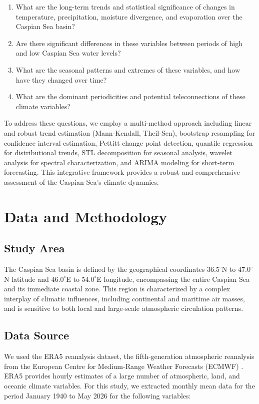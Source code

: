 \documentclass[12pt,a4paper]{article}
\begin{document}
\begin{enumerate}
    \item What are the long-term trends and statistical significance of changes in temperature, precipitation, moisture divergence, and evaporation over the Caspian Sea basin?
    \item Are there significant differences in these variables between periods of high and low Caspian Sea water levels?
    \item What are the seasonal patterns and extremes of these variables, and how have they changed over time?
    \item What are the dominant periodicities and potential teleconnections of these climate variables?
\end{enumerate}

To address these questions, we employ a multi-method approach including linear and robust trend estimation (Mann-Kendall, Theil-Sen), bootstrap resampling for confidence interval estimation, Pettitt change point detection, quantile regression for distributional trends, STL decomposition for seasonal analysis, wavelet analysis for spectral characterization, and ARIMA modeling for short-term forecasting. This integrative framework provides a robust and comprehensive assessment of the Caspian Sea's climate dynamics.

\section{Data and Methodology}

\subsection{Study Area}
The Caspian Sea basin is defined by the geographical coordinates $36.5^\circ$N to $47.0^\circ$N latitude and $46.0^\circ$E to $54.0^\circ$E longitude, encompassing the entire Caspian Sea and its immediate coastal zone. This region is characterized by a complex interplay of climatic influences, including continental and maritime air masses, and is sensitive to both local and large-scale atmospheric circulation patterns.

\subsection{Data Source}
We used the ERA5 reanalysis dataset, the fifth-generation atmospheric reanalysis from the European Centre for Medium-Range Weather Forecasts (ECMWF) \citep{hersbach2020}. ERA5 provides hourly estimates of a large number of atmospheric, land, and oceanic climate variables. For this study, we extracted monthly mean data for the period January 1940 to May 2026 for the following variables:
\end{document}
